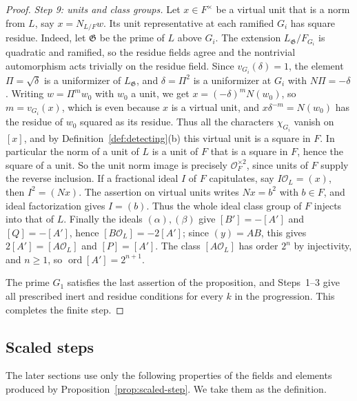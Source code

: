 \documentclass[11pt]{article}
\theoremstyle{plain}
\theoremstyle{definition}
\theoremstyle{remark}
\DeclareMathOperator{\ord}{ord}
\newcommand{\OO}{\mathcal O}
\begin{document}
\begin{proof}
\emph{Step 9: units and class groups.}  Let $x\in F^\times$ be a virtual
unit that is a norm from $L$, say $x=N_{L/F}w$.  Its unit representative
at each ramified $G_i$ has square residue.  Indeed, let $\mathfrak G$ be
the prime of $L$ above $G_i$.  The extension $L_{\mathfrak
G}/F_{G_i}$ is quadratic and ramified, so the residue fields agree and
the nontrivial automorphism acts trivially on the residue field.  Since
$v_{G_i}(\delta)=1$, the element $\Pi=\sqrt\delta$ is a uniformizer of
$L_{\mathfrak G}$, and $\delta=\Pi^2$ is a uniformizer at $G_i$ with
$N\Pi=-\delta$.  Writing $w=\Pi^mw_0$ with $w_0$ a unit, we get
$x=(-\delta)^mN(w_0)$, so $m=v_{G_i}(x)$, which is even because $x$ is a
virtual unit, and $x\delta^{-m}=N(w_0)$
has the residue of $w_0$ squared as its residue.  Thus all the characters
$\chi_{G_i}$ vanish on $[x]$, and by Definition~\ref{def:detecting}(b)
this virtual unit is a square in $F$.  In particular the norm of a unit
of $L$ is a unit of $F$ that is a square in $F$, hence the square of a
unit.  So the unit norm image is precisely $\OO_F^{\times2}$, since units
of $F$ supply the reverse inclusion.  If a fractional ideal $I$ of $F$
capitulates, say $I\OO_L=(x)$, then $I^2=(Nx)$.  The assertion on virtual
units writes $Nx=b^2$ with $b\in F$, and ideal factorization gives
$I=(b)$.  Thus the whole ideal class group of $F$ injects into that of
$L$.  Finally the ideals $(\alpha),(\beta)$ give $[B']=-[A']$ and
$[Q]=-[A']$, hence $[B\OO_L]=-2[A']$; since $(y)=AB$, this gives
$2[A']=[A\OO_L]$ and $[P]=[A']$.  The class $[A\OO_L]$ has order $2^n$ by
injectivity, and $n\ge1$, so $\ord[A']=2^{n+1}$.

The prime $G_1$ satisfies the last assertion of the proposition, and
Steps~1--3 give all prescribed inert and residue conditions for every
$k$ in the progression.  This completes the finite step.
\end{proof}

\subsection{Scaled steps}\label{sec:scaled-steps}
The later sections use only the following properties of the fields and
elements produced by Proposition~\ref{prop:scaled-step}.  We take them
as the definition.
\end{document}
